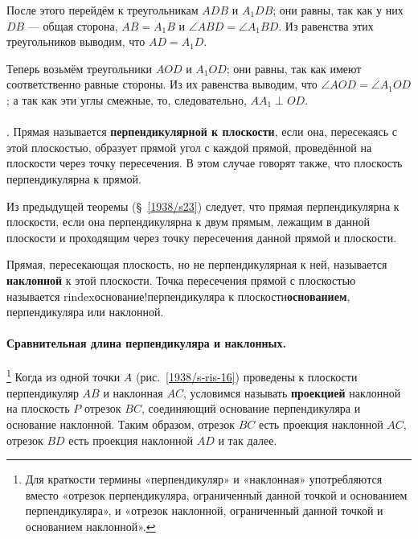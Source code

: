 После этого перейдём к треугольникам $ADB$ и $A_1DB$;
они равны, так как у них $DB$ — общая сторона, $AB=A_1B$ и $\angle ABD=\angle A_1BD$.
Из равенства этих треугольников выводим, что $AD=A_1D$.

Теперь возьмём треугольники $AOD$ и $A_1OD$;
они равны, так как имеют соответственно равные стороны.
Из их равенства выводим, что $\angle AOD=\angle A_1OD$;
а так как эти углы смежные, то, следовательно, $AA_1\perp OD$.

\paragraph{}\label{1938/s24}
.
Прямая называется \textbf{перпендикулярной к плоскости}, если она, пересекаясь с этой плоскостью, образует прямой угол с каждой прямой, проведённой на плоскости через точку пересечения.
В этом случае говорят также, что плоскость перпендикулярна к прямой.

Из предыдущей теоремы (§~\ref{1938/s23}) следует, что прямая перпендикулярна к плоскости, если она перпендикулярна к двум прямым, лежащим в данной плоскости и проходящим через точку пересечения данной прямой и плоскости.

Прямая, пересекающая плоскость, но не перпендикулярная к ней, называется \textbf{наклонной} к этой плоскости.
Точка пересечения прямой с плоскостью называется rindex{основание!перпендикуляра к плоскости}\textbf{основанием}, перпендикуляра или наклонной.


\paragraph{Сравнительная длина перпендикуляра и наклонных.}\label{1938/s25}%
\footnote{Для краткости термины «перпендикуляр» и «наклонная» употребляются вместо «отрезок перпендикуляра, ограниченный данной точкой и основанием перпендикуляра», и «отрезок наклонной, ограниченный данной точкой и основанием наклонной».}
Когда из одной точки $A$ (рис.~\ref{1938/s-ris-16}) проведены к плоскости перпендикуляр $AB$ и наклонная $AC$, условимся называть \textbf{проекцией} наклонной на плоскость $P$ отрезок $BC$, соединяющий основание перпендикуляра и основание наклонной.
Таким образом, отрезок $BC$ есть проекция наклонной $AC$, отрезок $BD$ есть проекция наклонной $AD$ и так далее.

\medskip

